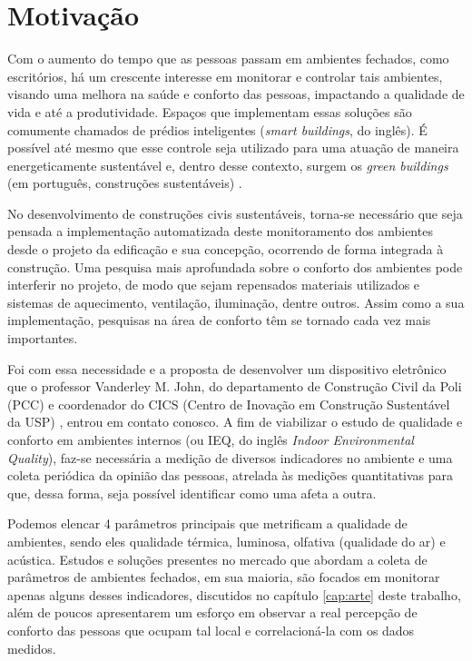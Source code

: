 \documentclass[../monografia.tex]{subfiles}
\begin{document}
\section{Motivação}

Com o aumento do tempo que as pessoas passam em ambientes fechados, como escritórios, há um crescente interesse em monitorar e controlar tais ambientes, visando uma melhora na saúde e conforto das pessoas, impactando a qualidade de vida e até a produtividade. Espaços que implementam essas soluções são comumente chamados de prédios inteligentes (\textit{smart buildings}, do inglês). É possível até mesmo que esse controle seja utilizado para uma atuação de maneira energeticamente sustentável e, dentro desse contexto, surgem os \textit{green buildings} (em português, construções sustentáveis) \cite{GreenBuildings} \cite{EnergyBuildings}.

No desenvolvimento de construções civis sustentáveis, torna-se necessário que seja pensada a implementação automatizada deste monitoramento dos ambientes desde o projeto da edificação e sua concepção, ocorrendo de forma integrada à construção. Uma pesquisa mais aprofundada sobre o conforto dos ambientes pode interferir no projeto, de modo que sejam repensados materiais utilizados e sistemas de aquecimento, ventilação, iluminação, dentre outros. Assim como a sua implementação, pesquisas na área de conforto têm se tornado cada vez mais importantes. 

Foi com essa necessidade e a proposta de desenvolver um dispositivo eletrônico que o professor Vanderley M. John, do departamento de Construção Civil da Poli (PCC) e coordenador do CICS (Centro de Inovação em Construção Sustentável da USP) \cite{CICS}, entrou em contato conosco. A fim de viabilizar o estudo de qualidade e conforto em ambientes internos (ou IEQ, do inglês \textit{Indoor Environmental Quality}), faz-se necessária a medição de diversos indicadores no ambiente e uma coleta periódica da opinião das pessoas, atrelada às medições quantitativas para que, dessa forma, seja possível identificar como uma afeta a outra. 

Podemos elencar 4 parâmetros principais que metrificam a qualidade de ambientes, sendo eles qualidade térmica, luminosa, olfativa (qualidade do ar) e acústica. Estudos e soluções presentes no mercado que abordam a coleta de parâmetros de ambientes fechados, em sua maioria, são focados em monitorar apenas alguns desses indicadores, discutidos no capítulo \ref{cap:arte} deste trabalho, além de poucos apresentarem um esforço em observar a real percepção de conforto das pessoas que ocupam tal local e correlacioná-la com os dados medidos.
\end{document}

